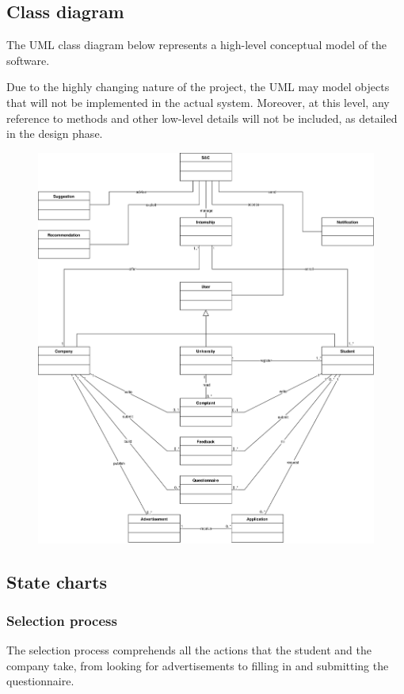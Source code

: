 \subsection{Class diagram}

The UML class diagram below represents a high-level conceptual model of the software.

Due to the highly changing nature of the project, the UML may model objects that will not be implemented in the actual system.
Moreover, at this level, any reference to methods and other low-level details will not be included, as detailed in the design phase.

\begin{figure}[H]
    \centering
    \includegraphics[width=0.8\linewidth]{../assets/class-diagrams/SC-UML.png}
\end{figure}

\subsection{State charts}

\subsubsection{Selection process}

The selection process comprehends all the actions that the student and the company take, from looking for advertisements to filling in and submitting the questionnaire.

